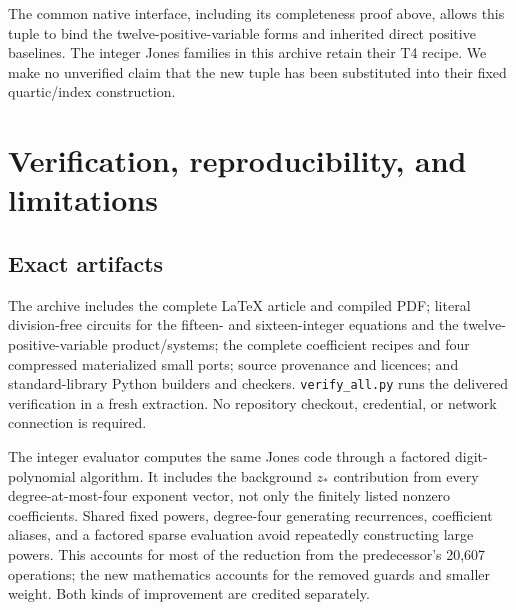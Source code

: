 \documentclass[11pt]{article}
\theoremstyle{definition}\newtheorem{definition}[theorem]{Definition}
\begin{document}
The common native interface, including its completeness proof above, allows this tuple to bind the twelve-positive-variable forms and inherited direct positive baselines. The integer Jones families in this archive retain their T4 recipe. We make no unverified claim that the new tuple has been substituted into their fixed quartic/index construction.

\section{Verification, reproducibility, and limitations}\label{sec:verification}
\subsection{Exact artifacts}
The archive includes the complete LaTeX article and compiled PDF; literal division-free circuits for the fifteen- and sixteen-integer equations and the twelve-positive-variable product/systems; the complete coefficient recipes and four compressed materialized small ports; source provenance and licences; and standard-library Python builders and checkers. \texttt{verify\_all.py} runs the delivered verification in a fresh extraction. No repository checkout, credential, or network connection is required.

The integer evaluator computes the same Jones code through a factored digit-polynomial algorithm. It includes the background $z_*$ contribution from every degree-at-most-four exponent vector, not only the finitely listed nonzero coefficients. Shared fixed powers, degree-four generating recurrences, coefficient aliases, and a factored sparse evaluation avoid repeatedly constructing large powers. This accounts for most of the reduction from the predecessor's 20,607 operations; the new mathematics accounts for the removed guards and smaller weight. Both kinds of improvement are credited separately.
\end{document}
